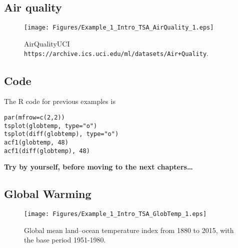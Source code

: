 \documentclass[
paper=128mm:96mm, %
fontsize=9.5pt, %
pagesize, %
parskip=half-, %
]{scrartcl} %
\theoremstyle{mythmstyle} %
\begin{document}
%
\subsection{Air quality}
\begin{figure}[!h]
\begin{center}
%
\texttt{[image: Figures/Example\_1\_Intro\_TSA\_AirQuality\_1.eps]}
%
\caption{\footnotesize{AirQualityUCI \texttt{https://archive.ics.uci.edu/ml/datasets/Air+Quality}.}}
%
\label{fig:GME_Prices_12_1}
%
\end{center}
\end{figure}
%
\clearpage

\subsection*{Code}

The R code for previous examples is

\begin{lstlisting}[belowskip=-0.8 \baselineskip]
par(mfrow=c(2,2))
tsplot(globtemp, type="o")
tsplot(diff(globtemp), type="o")
acf1(globtemp, 48)
acf1(diff(globtemp), 48)
\end{lstlisting}
%
\textbf{\color{red}Try by yourself, before moving to the next chapters\dots}
\clearpage

%
\subsection{Global Warming}
\begin{figure}[!h]
\begin{center}
%
\texttt{[image: Figures/Example\_1\_Intro\_TSA\_GlobTemp\_1.eps]}
%
\caption{\footnotesize{Global mean land--ocean temperature index from 1880 to 2015, with the base period 1951-1980.}}
%
\label{fig:globalwarming}
%
\end{center}
\end{figure}
%
\clearpage
\end{document}
